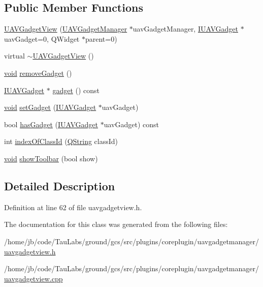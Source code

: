\subsection*{\-Public \-Member \-Functions}
\begin{DoxyCompactItemize}
\item 
\hyperlink{group___core_plugin_ga8fa8689dc8007240a249ca30aab120bc}{\-U\-A\-V\-Gadget\-View} (\hyperlink{class_core_1_1_u_a_v_gadget_manager}{\-U\-A\-V\-Gadget\-Manager} $\ast$uav\-Gadget\-Manager, \hyperlink{class_core_1_1_i_u_a_v_gadget}{\-I\-U\-A\-V\-Gadget} $\ast$uav\-Gadget=0, \-Q\-Widget $\ast$parent=0)
\item 
virtual \hyperlink{group___core_plugin_gaff77698d025839fe1253c9f844047967}{$\sim$\-U\-A\-V\-Gadget\-View} ()
\item 
\hyperlink{group___u_a_v_objects_plugin_ga444cf2ff3f0ecbe028adce838d373f5c}{void} \hyperlink{group___core_plugin_ga79f72e55f40ebeb515dd18587828dded}{remove\-Gadget} ()
\item 
\hyperlink{class_core_1_1_i_u_a_v_gadget}{\-I\-U\-A\-V\-Gadget} $\ast$ \hyperlink{group___core_plugin_ga61a5d78cd9753fa2d7521c742bdc1c99}{gadget} () const 
\item 
\hyperlink{group___u_a_v_objects_plugin_ga444cf2ff3f0ecbe028adce838d373f5c}{void} \hyperlink{group___core_plugin_gacc71a644bd52654f20b8761311a0162f}{set\-Gadget} (\hyperlink{class_core_1_1_i_u_a_v_gadget}{\-I\-U\-A\-V\-Gadget} $\ast$uav\-Gadget)
\item 
bool \hyperlink{group___core_plugin_ga09521ecca6702f1ce2904776b2c5d643}{has\-Gadget} (\hyperlink{class_core_1_1_i_u_a_v_gadget}{\-I\-U\-A\-V\-Gadget} $\ast$uav\-Gadget) const 
\item 
int \hyperlink{group___core_plugin_ga6b3bf8413c3b5d8d7eba4b046104a42c}{index\-Of\-Class\-Id} (\hyperlink{group___u_a_v_objects_plugin_gab9d252f49c333c94a72f97ce3105a32d}{\-Q\-String} class\-Id)
\item 
\hyperlink{group___u_a_v_objects_plugin_ga444cf2ff3f0ecbe028adce838d373f5c}{void} \hyperlink{group___core_plugin_ga0d98a8e6e0902672ffc3c977fbebb7b6}{show\-Toolbar} (bool show)
\end{DoxyCompactItemize}


\subsection{\-Detailed \-Description}


\-Definition at line 62 of file uavgadgetview.\-h.



\-The documentation for this class was generated from the following files\-:\begin{DoxyCompactItemize}
\item 
/home/jb/code/\-Tau\-Labs/ground/gcs/src/plugins/coreplugin/uavgadgetmanager/\hyperlink{uavgadgetview_8h}{uavgadgetview.\-h}\item 
/home/jb/code/\-Tau\-Labs/ground/gcs/src/plugins/coreplugin/uavgadgetmanager/\hyperlink{uavgadgetview_8cpp}{uavgadgetview.\-cpp}\end{DoxyCompactItemize}
